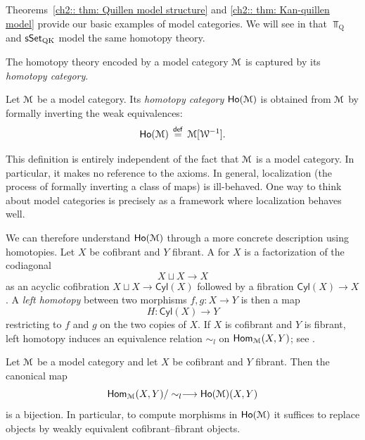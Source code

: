 \begin{remark}
  Theorems~\ref{ch2:: thm: Quillen model structure} and
  \ref{ch2:: thm: Kan-quillen model} provide our basic examples of model
  categories.  We will see in  that
  $\Top_{\mathrm Q}$ and $\operatorname{\sf sSet}_{\mathrm{QK}}$ model the same homotopy theory.
\end{remark}

The homotopy theory encoded by a model category $\mathcal M$ is captured by its
\emph{homotopy category}.

\begin{definition}
  Let $\mathcal M$ be a model category.  Its \emph{homotopy category}
  $\operatorname{\sf Ho}(\mathcal M)$ is obtained from $\mathcal M$ by formally inverting the weak
  equivalences:
  \begin{equation}
    \operatorname{\sf Ho}(\mathcal M) \,\overset{\sf def}{=} \, \mathcal M[\mathcal W^{-1}].
  \end{equation}
\end{definition}

This definition is entirely independent of the fact that $\mathcal M$ is a model
category.  In particular, it makes no reference to the axioms.  In general,
localization (the process of formally inverting a class of maps) is
ill-behaved.  One way to think about model categories is precisely as a
framework where localization behaves well.

We can therefore understand $\operatorname{\sf Ho}(\mathcal M)$ through a more concrete description
using homotopies.  Let $X$ be cofibrant and $Y$ fibrant.  A
 for $X$ is a factorization of the codiagonal
\begin{equation}
  X \sqcup X \longrightarrow X
\end{equation}
as an acyclic cofibration $X \sqcup X \to \mathsf{Cyl}(X)$ followed by a
fibration $\mathsf{Cyl}(X) \to X$.  A \emph{left homotopy} between two
morphisms $f,g \colon X \to Y$ is then a map
\begin{equation}
  H \colon \mathsf{Cyl}(X) \longrightarrow Y
\end{equation}
restricting to $f$ and $g$ on the two copies of $X$.  If $X$ is cofibrant and
$Y$ is fibrant, left homotopy induces an equivalence relation $\sim_l$ on
$\operatorname{\sf Hom}_{\mathcal M}(X,Y)$; see \cite[Proposition~4.7]{Hir14}.

\begin{theorem}\label{ch2:: thm: homotopy cat def}
  Let $\mathcal M$ be a model category and let $X$ be cofibrant and $Y$ fibrant.
  Then the canonical map
  \begin{equation}
    \operatorname{\sf Hom}_{\mathcal M}(X,Y)/\sim_{l}
    \longrightarrow
    \operatorname{\sf Ho}(\mathcal M)(X,Y)
  \end{equation}
  is a bijection.  In particular, to compute morphisms in $\operatorname{\sf Ho}(\mathcal M)$ it
  suffices to replace objects by weakly equivalent cofibrant–fibrant objects.
\end{theorem}


